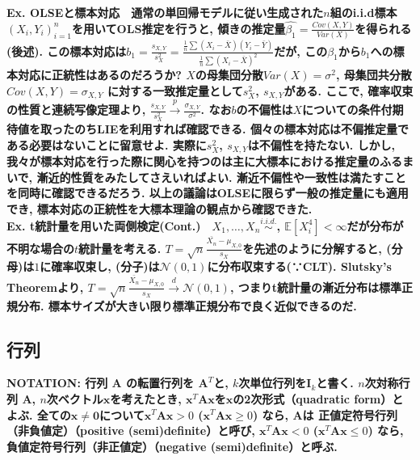 \documentclass[paper=a4paper,fontsize=10pt]{jlreq}
\begin{document}
\rmfamily\mcfamily\bfseries{Ex. OLSEと標本対応}\mdseries　通常の単回帰モデルに従い生成された$n$組のi.i.d標本$(X_i, Y_i)_{i=1}^{n}$を用いてOLS推定を行うと, 傾きの推定量$\hat{\beta_1}=\frac{Cov(X,Y)}{Var(X)}$を得られる(後述). この\rmfamily\mcfamily\bfseries{標本対応}\mdseries は$b_1=\frac{s_{X,Y}}{s^{2}_{X}}=\frac{\frac{1}{n}\sum{(X_{i}-\bar{X})(Y_{i}-\bar{Y})}}{\frac{1}{n}\sum{(X_{i}-\bar{X})^2}}$だが, この$\beta_1$から$b_1$への標本対応に正統性はあるのだろうか? $X$の母集団分散$Var(X)=\sigma^2$, 母集団共分散$Cov(X,Y)=\sigma_{X,Y}$ に対する一致推定量として$s^2_X$, $s_{X,Y}$がある. ここで, 確率収束の性質と連続写像定理より, $\frac{s_{X,Y}}{s^{2}_{X}} \overset{p}{\to} \frac{\sigma_{X,Y}}{\sigma^2}$. なお$b$の不偏性は$X$についての条件付期待値を取ったのちLIEを利用すれば確認できる. 個々の標本対応は不偏推定量である必要はないことに留意せよ. 実際に$s^2_X$, $s_{X,Y}$は不偏性を持たない. しかし, 我々が標本対応を行った際に関心を持つのは主に大標本における推定量のふるまいで, \rmfamily\mcfamily\bfseries{漸近的性質をみたしてさえいればよい}\mdseries . 漸近不偏性や一致性は満たすことを同時に確認できるだろう. 以上の議論はOLSEに限らず一般の推定量にも適用でき, 標本対応の正統性を大標本理論の観点から確認できた.\\

\rmfamily\mcfamily\bfseries{Ex. t統計量を用いた両側検定(Cont.)}\mdseries　$X_1, \dots, X_n \overset{i.i.d.}{\sim}$, $\mathbb{E}[X_i^4]<\infty$だが分布が不明な場合の$t$統計量を考える. $T=\sqrt{n} \frac{\bar{X_n}-\mu_{X,0}}{s_X}$を先述のように分解すると, (分母)は$1$に確率収束し, (分子)は$\mathcal{N}(0,1)$に分布収束する(∵CLT). Slutsky's Theoremより, $T=\sqrt{n} \frac{\bar{X_n}-\mu_{X,0}}{s_X} \overset{d}{\to} \mathcal{N}(0, 1)$, つまり\rmfamily\mcfamily\bfseries{t統計量の漸近分布は標準正規分布}\mdseries . 標本サイズが大きい限り標準正規分布で良く近似できるのだ.\\

\subsection{行列}
\rmfamily\mcfamily\bfseries{NOTATION}\mdseries : 行列 $\mathbf{A}$ の転置行列を $\mathbf{A}^{T}$と, $k$次単位行列を$\mathbf{I}_k$と書く. $n$次対称行列 $\mathbf{A}$, $n$次ベクトル$\mathbf{x}$を考えたとき, $\mathbf{x}^T\mathbf{A}\mathbf{x}$を$\mathbf{x}$の\rmfamily\mcfamily\bfseries{2次形式（quadratic form）}\mdseries とよぶ. 全ての$\mathbf{x} \neq  \mathbf{0}$について$\mathbf{x}^T\mathbf{A}\mathbf{x}>0$ ($\mathbf{x}^T\mathbf{A}\mathbf{x}\geq 0$) なら, $\mathbf{A}$は \rmfamily\mcfamily\bfseries{正値定符号行列（非負値定）（positive (semi)definite）}\mdseries と呼び,  $\mathbf{x}^T\mathbf{A}\mathbf{x}<0$ ($\mathbf{x}^T\mathbf{A}\mathbf{x}\leq0$) なら, \rmfamily\mcfamily\bfseries{負値定符号行列（非正値定）（negative (semi)definite）}\mdseries と呼ぶ.\\
\end{document}
